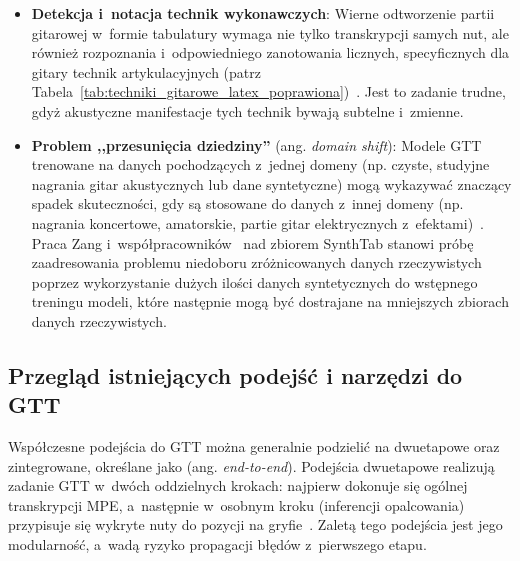 \begin{itemize}
    \item \textbf{Detekcja i~notacja technik wykonawczych}: Wierne odtworzenie partii gitarowej w~formie tabulatury wymaga nie tylko transkrypcji samych nut, ale również rozpoznania i~odpowiedniego zanotowania licznych, specyficznych dla gitary technik artykulacyjnych (patrz Tabela~\ref{tab:techniki_gitarowe_latex_poprawiona})~\autocite{Reboursiere2011GuitarController,Su2014SparseCepstral}. Jest to zadanie trudne, gdyż akustyczne manifestacje tych technik bywają subtelne i~zmienne.
    \item \textbf{Problem ,,przesunięcia dziedziny''} (ang. \textit{domain shift}): Modele GTT trenowane na danych pochodzących z~jednej domeny (np. czyste, studyjne nagrania gitar akustycznych lub dane syntetyczne) mogą wykazywać znaczący spadek skuteczności, gdy są stosowane do danych z~innej domeny (np. nagrania koncertowe, amatorskie, partie gitar elektrycznych z~efektami)~\autocite{Zang2023SynthTab}. Praca Zang i~współpracowników~\autocite{Zang2023SynthTab} nad zbiorem SynthTab stanowi próbę zaadresowania problemu niedoboru zróżnicowanych danych rzeczywistych poprzez wykorzystanie dużych ilości danych syntetycznych do wstępnego treningu modeli, które następnie mogą być dostrajane na mniejszych zbiorach danych rzeczywistych.
\end{itemize}


\subsection{Przegląd istniejących podejść i narzędzi do GTT}
\label{ssec:podejscia_narzedzia_gtt}

Współczesne podejścia do GTT można generalnie podzielić na dwuetapowe oraz zintegrowane, określane jako (ang. \textit{end-to-end}). Podejścia dwuetapowe realizują zadanie GTT w~dwóch oddzielnych krokach: najpierw dokonuje się ogólnej transkrypcji MPE, a~następnie w~osobnym kroku (inferencji opalcowania) przypisuje się wykryte nuty do pozycji na gryfie~\autocite{BurletHindle2017IsolatedGuitarTranscription}. Zaletą tego podejścia jest jego modularność, a~wadą ryzyko propagacji błędów z~pierwszego etapu.

